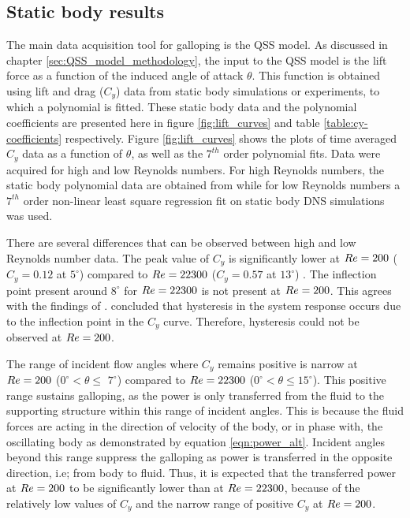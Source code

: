 \subsection{Static body results}

The main data acquisition tool for galloping is the QSS model. As discussed in chapter \ref{sec:QSS_model_methodology}, the input to the QSS model is the lift force as a function of the induced angle of attack $\theta$. This function is obtained using lift and drag ($C_y$) data from static body simulations or experiments, to which a polynomial is fitted. These static body data and the polynomial coefficients are presented here in figure \ref{fig:lift_curves} and table \ref{table:cy-coefficients} respectively.  Figure \ref{fig:lift_curves} shows the plots of time averaged $C_y$ data as a function of $\theta$, as well as the $7^{th}$ order polynomial fits. Data were acquired for high and low Reynolds numbers. For high Reynolds numbers, the static body polynomial data are obtained from \cite{Parkinson1964} while for low Reynolds numbers a $7^{th}$ order non-linear least square regression fit on static body DNS simulations was used.





There are several differences that can be observed between high and low Reynolds number data. The peak value of $C_y$ is  significantly lower at $Re=200$ ($C_y=0.12$ at $5^\circ$) compared to $Re=22300$ ($C_y=0.57$ at $13^\circ$) . The inflection point present around $8^\circ$ for $Re=22300$ is not present at $Re=200$. This agrees with the findings of \cite{Luo2003}. \cite{Luo2003} concluded that hysteresis in the system response occurs due to the inflection point in the $C_y$ curve. Therefore, hysteresis could not be observed at $Re=200$.

The range of incident flow angles where $C_y$ remains positive is narrow at $Re=200$ ($0^\circ <\theta \leq$ $7^\circ$) compared to $Re=22300$ ($0^\circ <\theta \leq 15^\circ$). This positive range sustains galloping, as the power is only transferred from the fluid to the supporting structure within this range of incident angles. This is because the fluid forces are acting in the 
direction of velocity of the body, or in phase with, the oscillating body as demonstrated by equation \ref{eqn:power_alt}. Incident angles beyond this range suppress the galloping as power is transferred in the opposite direction, i.e; from body to fluid. Thus, it is expected that the transferred power at $Re=200$ to be significantly lower than at $Re=22300$, because of the relatively low values of $C_y$ and the narrow range of positive $C_y$ at $Re=200$.



